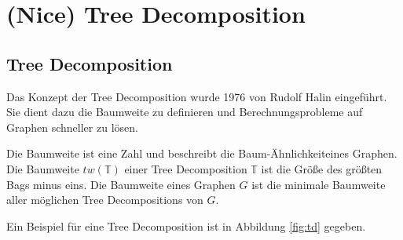 %
%
%
\chapter{(Nice) Tree Decomposition}
\label{c:ntd} %

\section{Tree Decomposition}
\label{sec:ntd_td}

Das Konzept der Tree Decomposition wurde 1976 von Rudolf Halin\cite{Halin1976} eingeführt. Sie dient dazu die Baumweite zu definieren und Berechnungsprobleme auf Graphen schneller zu lösen.

Die Baumweite ist eine Zahl und beschreibt die \glqq Baum-Ähnlichkeit\grqq eines Graphen. Die Baumweite $tw(\mathbb{T})$ einer Tree Decomposition $\mathbb{T}$ ist die Größe des größten Bags minus eins. Die Baumweite eines Graphen $G$ ist die minimale Baumweite aller möglichen Tree Decompositions von $G$.

Ein Beispiel für eine Tree Decomposition ist in Abbildung \ref{fig:td} gegeben.


